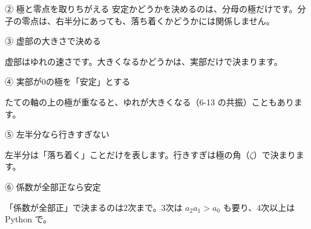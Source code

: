 \begin{tsumazuki}{② 極と零点を取りちがえる}
安定かどうかを決めるのは、分母の極だけです。分子の零点は、右半分にあっても、落ち着くかどうかには関係しません。
\end{tsumazuki}

\begingroup{}%
\noindent\begin{minipage}[t]{0.485\linewidth}\vspace{0pt}
\begin{tsumazuki}{③ 虚部の大きさで決める}
\raggedright{}
虚部はゆれの速さです。大きくなるかどうかは、実部だけで決まります。
\end{tsumazuki}
\end{minipage}\hfill
\begin{minipage}[t]{0.485\linewidth}\vspace{0pt}
\begin{tsumazuki}{④ 実部が0の極を「安定」とする}
\raggedright{}
たての軸の上の極が重なると、ゆれが大きくなる（6-13 の共振）こともあります。
\end{tsumazuki}
\end{minipage}\par
\endgroup

\begingroup{}%
\noindent\begin{minipage}[t]{0.485\linewidth}\vspace{0pt}
\begin{tsumazuki}{⑤ 左半分なら行きすぎない}
\raggedright{}
左半分は「落ち着く」ことだけを表します。行きすぎは極の角（$\zeta$）で決まります。
\end{tsumazuki}
\end{minipage}\hfill
\begin{minipage}[t]{0.485\linewidth}\vspace{0pt}
\begin{tsumazuki}{⑥ 係数が全部正なら安定}
\raggedright{}
「係数が全部正」で決まるのは2次まで。3次は $a_2a_1>a_0$ も要り、4次以上は Python で。
\end{tsumazuki}
\end{minipage}\par
\endgroup

